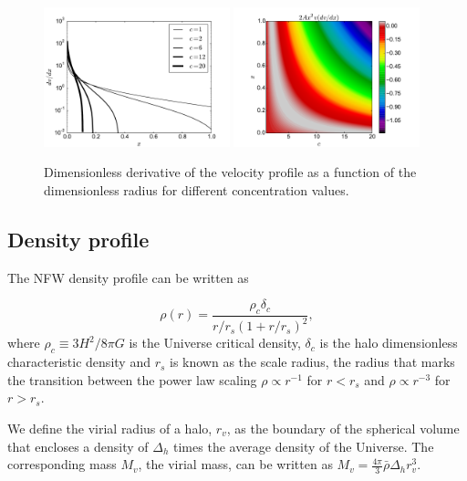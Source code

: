 \documentclass[useAMS,usenatbib]{mn2e}
\begin{document}
\begin{figure}
\begin{center}
  \includegraphics[width=0.48\textwidth]{dv_dx.pdf}
  \includegraphics[width=0.48\textwidth]{zeros.pdf}
\end{center}
\caption{Dimensionless derivative of the velocity profile as a
  function of the dimensionless radius for different concentration
  values. \label{fig:profiles}}
\end{figure}

\subsection{Density profile}

The NFW density profile can be written as

\begin{equation}
\rho(r) = \frac{\rho_c\delta_c}{r/r_s(1+r/r_s)^2},
\label{eq:definition}
\end{equation}
%
where $\rho_c\equiv 3H^2/8\pi G$ is the Universe critical density,
$\delta_c$ is the halo dimensionless characteristic density and $r_s$
is known as the scale radius, the radius that marks the transition
between the power law scaling $\rho\propto r^{-1}$ for
$r<r_s$ and $\rho\propto r^{-3}$ for  $r>r_s$.

We define the virial radius of a halo, $r_v$, as the boundary of the
spherical volume that encloses a density of $\Delta_h$ times
the average density of the Universe. The corresponding mass $M_{v}$,
the virial mass, can be written as $M_{v} =
\frac{4\pi}{3}\bar{\rho}\Delta_h r_v^3$.
\end{document}

